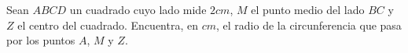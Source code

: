 Sean $ABCD$ un cuadrado cuyo lado mide $2 cm$, $M$ el punto medio del lado $BC$ y $Z$ el centro del cuadrado. Encuentra, en $cm$, el radio de la circunferencia que pasa por los puntos $A$, $M$ y $Z$.